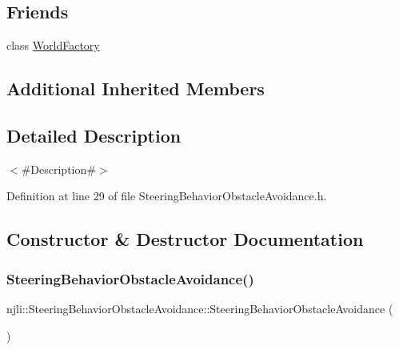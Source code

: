 \subsection*{Friends}
\begin{DoxyCompactItemize}
\item 
class \mbox{\hyperlink{classnjli_1_1_steering_behavior_obstacle_avoidance_acb96ebb09abe8f2a37a915a842babfac}{World\+Factory}}
\end{DoxyCompactItemize}
\subsection*{Additional Inherited Members}


\subsection{Detailed Description}
$<$\#\+Description\#$>$ 

Definition at line 29 of file Steering\+Behavior\+Obstacle\+Avoidance.\+h.



\subsection{Constructor \& Destructor Documentation}
\mbox{\label{classnjli_1_1_steering_behavior_obstacle_avoidance_adad91d1481840efe2a068f51e8153c5e}} 
\subsubsection{\texorpdfstring{Steering\+Behavior\+Obstacle\+Avoidance()}{SteeringBehaviorObstacleAvoidance()}\hspace{0.1cm}{\footnotesize\ttfamily [1/3]}}
{\footnotesize\ttfamily njli\+::\+Steering\+Behavior\+Obstacle\+Avoidance\+::\+Steering\+Behavior\+Obstacle\+Avoidance (\begin{DoxyParamCaption}{ }\end{DoxyParamCaption})\hspace{0.3cm}{\ttfamily [protected]}}

